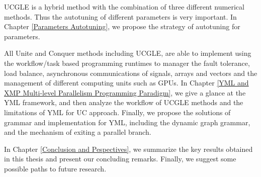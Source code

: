 UCGLE is a hybrid method with the combination of three different numerical methods. Thus the autotuning of different parameters is very important. In Chapter \ref{Parameters Autotuning}, we propose the strategy of autotuning for parameters. %

All Unite and Conquer methods including UCGLE, are able to implement using the workflow/task based programming runtimes to manager the fault tolerance, load balance, asynchronous communications of signals, arrays and vectors and the management of different computing units such as GPUs. In Chapter \ref{YML and XMP Multi-level Parallelism Programming Paradigm}, we give a glance at the YML framework, and then analyze the workflow of UCGLE methods and the limitations of YML for UC approach. Finally, we propose the solutions of grammar and implementation for YML, including the dynamic graph grammar, and the mechanism of exiting a parallel branch.

In Chapter \ref{Conclusion and Pespectives}, we summarize the key results obtained in this thesis and present our concluding remarks. Finally, we suggest some possible paths to future research.
